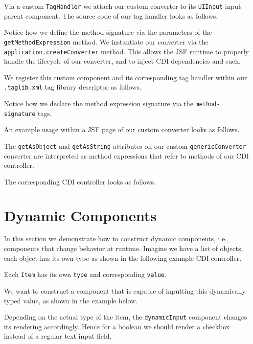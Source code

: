 Via a custom \texttt{TagHandler} we attach our custom converter to its \texttt{UIInput} input parent component.
The source code of our tag handler looks as follows.

Notice how we define the method signature via the parameters of the \texttt{getMethod\allowbreak Expression} method.
We instantiate our converter via the \texttt{application.createConverter} method.
This allows the JSF runtime to properly handle the lifecycle of our converter, and to inject CDI dependencies and such.

We register this custom component and its corresponding tag handler within our \texttt{.taglib.xml} tag library descriptor as follows.

Notice how we declare the method expression signature via the \texttt{method-signature} tags.

An example usage within a JSF page of our custom converter looks as follows.

The \texttt{getAsObject} and \texttt{getAsString} attributes on our custom \texttt{genericConverter} converter are interpreted as method expressions that refer to methods of our CDI controller.

The corresponding CDI controller looks as follows.



\section{Dynamic Components}
\label{sec:dynamic-components}
In this section we demonstrate how to construct dynamic components, i.e., components that change behavior at runtime.
Imagine we have a list of objects, each object has its own type as shown in the following example CDI controller.

Each \texttt{Item} has its own \texttt{type} and corresponding \texttt{value}.

We want to construct a component that is capable of inputting this dynamically typed value, as shown in the example below.

Depending on the actual type of the item, the \texttt{dynamicInput} component changes its rendering accordingly.
Hence for a boolean we should render a checkbox instead of a regular text input field.

